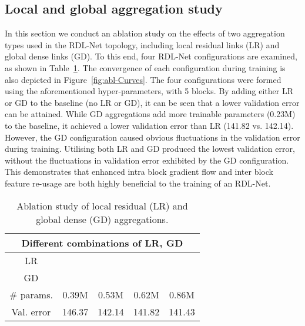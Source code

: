 \documentclass[letterpaper]{article} \usepackage{aaai20}  \usepackage{times}  \usepackage{helvet} \usepackage{courier}  \usepackage[hyphens]{url}  \usepackage{graphicx} \urlstyle{rm} \def\UrlFont{\rm}  \usepackage{graphicx}  \frenchspacing  \setlength{\pdfpagewidth}{8.5in}  \setlength{\pdfpageheight}{11in}
\newcommand{\cmark}{\ding{51}}\newcommand{\xmark}{\ding{53}}\pgfplotsset{compat=1.3}
\begin{document}
\subsection{Local and global aggregation study}\label{subsec:abls}
In this section we conduct an ablation study on the effects of two aggregation types used in the RDL-Net topology, including local residual links (LR) and global dense links (GD). To this end, four RDL-Net configurations are examined, as shown in Table~\ref{table_ablstudy}. The convergence of each configuration during training is also depicted in Figure~\ref{fig:abl-Curves}. The four configurations were formed using the aforementioned hyper-parameters, with 5 blocks. By adding either LR or GD to the baseline (no LR or GD), it can be seen that a lower validation error can be attained. While GD aggregations add more trainable parameters (0.23M) to the baseline, it achieved a lower validation error than LR (141.82 vs. 142.14). However, the GD configuration caused obvious fluctuations in the validation error during training. Utilising both LR and GD produced the lowest validation error, without the fluctuations in validation error exhibited by the GD configuration. This demonstrates that enhanced intra block gradient flow and inter block feature re-usage are both highly beneficial to the training of an RDL-Net.


\begin{table}[t]
\centering
\caption{Ablation study of local residual (LR) and global dense (GD) aggregations.}
\begin{tabular}{c|c|c|c|c} 
 \hline
 \multicolumn{5}{c}{Different combinations of LR, GD} \\ [0.5ex] 
 \hline\hline
 LR & \xmark & \cmark& \xmark & \cmark\\ 
 GD & \xmark & \xmark & \cmark & \cmark\\ [0.5ex]
 \hline\hline
 \# params.& 0.39M & 0.53M & 0.62M & 0.86M \\\hline
 Val. error & 146.37& 142.14& 141.82& 141.43 \\
 \hline
\end{tabular}
\label{table_ablstudy}
\end{table}
\end{document}
